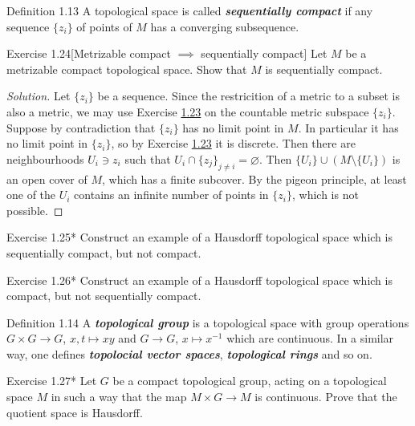\begin{thing3}{Definition 1.13}\leavevmode
	A topological space is called \textit{\textbf{sequentially compact}} if any sequence $\{z_i\}$ of points of $M$ has a converging subsequence.
\end{thing3}

\begin{thing4}{Exercise 1.24}[Metrizable compact $\implies $ sequentially compact]\label{exer:1.24}\leavevmode
	Let $M$ be a metrizable compact topological space. Show that $M$ is sequentially compact.
\end{thing4}

\begin{proof}[Solution]\leavevmode
Let $\{z_i\}$ be a sequence. Since the restricition of a metric to a subset is also a metric, we may use Exercise \hyperref[exer:1.23]{1.23} on the countable metric subspace $\{z_i\}$. Suppose by contradiction that $\{z_i\}$ has no limit point in $M$. In particular it has no limit point in $\{z_i\}$, so by Exercise \hyperref[exer:1.23]{1.23} it is discrete. Then there are neighbourhoods $U_i \ni z_i$ such that $U_i \cap\{z_j\}_{j \neq  i}=\varnothing$. Then $\{U_i\} \cup  (M\setminus \{U_i\})$ is an open cover of $M$, which has a finite subcover. By the pigeon principle, at least one of the $U_i$ contains an infinite number of points in $\{z_i\}$, which is not possible.
\end{proof}
\iffalse
\begin{thing4}{Exercise 1.25*}\label{exer:1.25}\leavevmode
Construct an example of a Hausdorff topological space which is sequentially compact, but not compact.
\end{thing4}

\begin{thing4}{Exercise 1.26*}\label{exer:1.26}\leavevmode
Construct an example of a Hausdorff topological space which is compact, but not sequentially compact.
\end{thing4}

\begin{thing3}{Definition 1.14}\leavevmode
	A \textit{\textbf{topological group}} is a topological space with group operations $G \times G \longrightarrow G$, $x,t \mapsto xy$ and $G\longrightarrow G$, $x \mapsto  x^{-1}$ which are continuous. In a similar way, one defines \textit{\textbf{topolocial vector spaces}}, \textit{\textbf{topological rings}} and so on.
\end{thing3}

\begin{thing4}{Exercise 1.27*}\label{exer:1.27}\leavevmode
Let $G$ be a compact topological group, acting on a topological space $M$ in such a way that the map $M \times G \longrightarrow M$ is continuous. Prove that the quotient space is Hausdorff.
\end{thing4}

